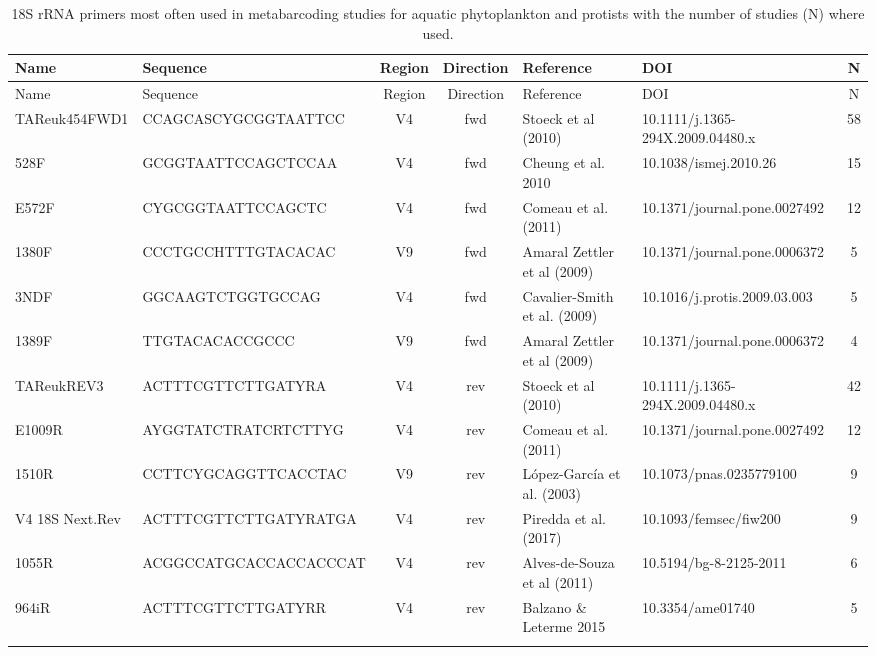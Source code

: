 \begin{longtable}{llccllc}
\caption{18S rRNA primers most often used in metabarcoding studies for aquatic phytoplankton and protists with the number of studies (N) where used.} \\ 
  \hline
  Name & Sequence & Region & Direction & Reference & DOI & N \\
 \endfirsthead 
 \hline 
 Name & Sequence & Region & Direction & Reference & DOI & N \\
 \hline 
 \endhead 
 \hline 
 \endfoot 
  \endlastfoot 
 \hline
TAReuk454FWD1 & CCAGCASCYGCGGTAATTCC & V4 & fwd & Stoeck et al (2010) & 10.1111/j.1365-294X.2009.04480.x & 58 \\ 
  528F & GCGGTAATTCCAGCTCCAA & V4 & fwd & Cheung et al. 2010 & 10.1038/ismej.2010.26 & 15 \\ 
  E572F & CYGCGGTAATTCCAGCTC & V4 & fwd & Comeau et al. (2011) & 10.1371/journal.pone.0027492 & 12 \\ 
  1380F & CCCTGCCHTTTGTACACAC & V9 & fwd & Amaral Zettler et al (2009) & 10.1371/journal.pone.0006372 & 5 \\ 
  3NDF & GGCAAGTCTGGTGCCAG & V4 & fwd & Cavalier-Smith et al. (2009) & 10.1016/j.protis.2009.03.003 & 5 \\ 
  1389F & TTGTACACACCGCCC & V9 & fwd & Amaral Zettler et al (2009) & 10.1371/journal.pone.0006372 & 4 \\ 
  TAReukREV3 & ACTTTCGTTCTTGATYRA & V4 & rev & Stoeck et al (2010) & 10.1111/j.1365-294X.2009.04480.x & 42 \\ 
  E1009R & AYGGTATCTRATCRTCTTYG & V4 & rev & Comeau et al. (2011) & 10.1371/journal.pone.0027492 & 12 \\ 
  1510R & CCTTCYGCAGGTTCACCTAC & V9 & rev & López-García et al. (2003) & 10.1073/pnas.0235779100 & 9 \\ 
  V4 18S Next.Rev & ACTTTCGTTCTTGATYRATGA & V4 & rev & Piredda et al. (2017) & 10.1093/femsec/fiw200 & 9 \\ 
  1055R & ACGGCCATGCACCACCACCCAT & V4 & rev & Alves-de-Souza et al (2011) & 10.5194/bg-8-2125-2011 & 6 \\ 
  964iR & ACTTTCGTTCTTGATYRR & V4 & rev & Balzano \& Leterme 2015 & 10.3354/ame01740  & 5 \\ 
   \hline
\hline
\label{tab:primers}
\end{longtable}
